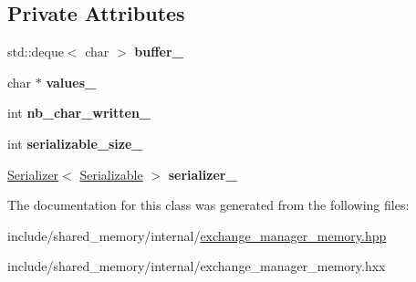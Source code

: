 \subsection*{Private Attributes}
\begin{DoxyCompactItemize}
\item 
\mbox{\label{classshared__memory_1_1internal_1_1Serialized__write_a09aebade690ec6a326a401ab2d2f4f53}} 
std\+::deque$<$ char $>$ {\bfseries buffer\+\_\+}
\item 
\mbox{\label{classshared__memory_1_1internal_1_1Serialized__write_aec4432c789df9a8fd2c037063e3a29b1}} 
char $\ast$ {\bfseries values\+\_\+}
\item 
\mbox{\label{classshared__memory_1_1internal_1_1Serialized__write_a7a207fb34addd19507a6b6e9c614115c}} 
int {\bfseries nb\+\_\+char\+\_\+written\+\_\+}
\item 
\mbox{\label{classshared__memory_1_1internal_1_1Serialized__write_a273f48479dce32197d27efa2cbe637ef}} 
int {\bfseries serializable\+\_\+size\+\_\+}
\item 
\mbox{\label{classshared__memory_1_1internal_1_1Serialized__write_a57ab5f2496bfff9ac5c5a6246aab7e9c}} 
\hyperlink{classshared__memory_1_1Serializer}{Serializer}$<$ \hyperlink{classSerializable}{Serializable} $>$ {\bfseries serializer\+\_\+}
\end{DoxyCompactItemize}


The documentation for this class was generated from the following files\+:\begin{DoxyCompactItemize}
\item 
include/shared\+\_\+memory/internal/\hyperlink{exchange__manager__memory_8hpp}{exchange\+\_\+manager\+\_\+memory.\+hpp}\item 
include/shared\+\_\+memory/internal/exchange\+\_\+manager\+\_\+memory.\+hxx\end{DoxyCompactItemize}
